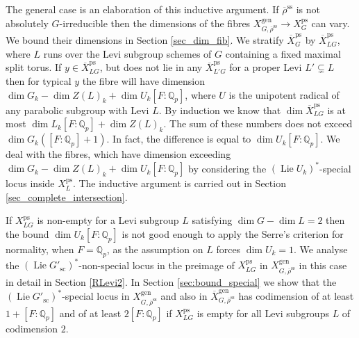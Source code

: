 \documentclass{amsart}
\theoremstyle{definition}
\theoremstyle{remark}
\newcommand{\Qp}{\mathbb {Q}_p}
\newcommand{\rhobar}{\overline{\rho}}
\newcommand{\ps}{\mathrm{ps}}
\newcommand{\gen}{\mathrm{gen}}
\newcommand{\Xbar}{\overline{X}}
\DeclareMathOperator{\Lie}{Lie}
\newcommand{\rhobarss}{\rhobar^{\mathrm{ss}}}
\newcommand{\sic}{\operatorname{sc}}
\begin{document}
The general case is an elaboration of this inductive argument. If $\rhobarss$ is not absolutely $G$-irreducible 
then the dimensions of the fibres $X^{\gen}_{G, \rhobarss}\rightarrow X^{\ps}_G$ can vary. We bound their dimensions in 
Section \ref{sec_dim_fib}. 
We stratify $\Xbar^{\ps}_G$ by $\Xbar^{\ps}_{LG}$, where $L$ runs over the Levi subgroup schemes of $G$ containing a fixed 
 maximal split torus. If $y\in \Xbar^{\ps}_{LG}$, but does not lie in any $\Xbar^{\ps}_{L'G}$ for a proper Levi $L'\subsetneq L$ then 
for typical $y$ the fibre will have dimension $\dim G_k - \dim Z(L)_k +\dim U_k [F:\Qp]$, where $U$ is the unipotent radical 
of any parabolic subgroup with Levi $L$. By induction we know that $\dim \Xbar^{\ps}_{LG}$ is at most $\dim L_k [F:\Qp]+ \dim Z(L)_k$.
The sum of these numbers does not exceed $\dim G_k ([F:\Qp]+1)$. In fact, the difference is equal to $\dim U_k [F:\Qp]$. We 
deal with the fibres, which have dimension exceeding $\dim G_k - \dim Z(L)_k +\dim U_k [F:\Qp]$ by considering the $(\Lie U_k)^{\ast}$-special 
locus inside $X^{\ps}_L$. The inductive argument  is carried out in Section \ref{sec_complete_intersection}.

If $X^{\ps}_{LG}$ is non-empty for a Levi subgroup $L$ satisfying $\dim G -\dim L=2$ then the bound $\dim U_k [F:\Qp]$ is not 
good enough to apply the Serre's criterion for normality, when $F=\Qp$, as the assumption on $L$ forces $\dim U_k = 1$. We
analyse the $(\Lie G'_{\sic})^{\ast}$-non-special locus in the preimage 
of $X^{\ps}_{LG}$ in $X^{\gen}_{G, \rhobarss}$ in this case in detail in Section \ref{RLevi2}. In Section \ref{sec:bound_special} we show that the 
$(\Lie G'_{\sic})^{\ast}$-special locus in $X^{\gen}_{G, \rhobarss}$ and also in $\Xbar^{\gen}_{G, \rhobarss}$ has codimension of at least $1+[F:\Qp]$
and of at least $2[F:\Qp]$ if $X^{\ps}_{LG}$ is empty for all Levi subgroups $L$ of codimension $2$.
\end{document}
